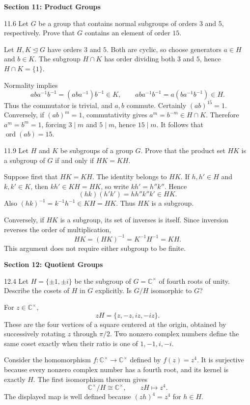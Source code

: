 \documentclass[11pt]{article}
\newcommand{\sectionheading}[1]{%
  \Needspace{8\baselineskip}
  \vspace{0.25em}
  {\color{darkgray}\large\bfseries #1}\par
}
\newcommand{\C}{\mathbb C}
\begin{document}
\sectionheading{Section 11: Product Groups}

\begin{exercise}{11.6}
Let $G$ be a group that contains normal subgroups of orders $3$ and $5$,
respectively. Prove that $G$ contains an element of order $15$.
\end{exercise}

\begin{solution}
Let $H,K\trianglelefteq G$ have orders $3$ and $5$. Both are cyclic, so choose generators $a\in H$ and $b\in K$. The subgroup $H\cap K$ has order dividing both $3$ and $5$, hence $H\cap K=\{1\}$.

Normality implies
\[
 aba^{-1}b^{-1}=(aba^{-1})b^{-1}\in K,
 \qquad
 aba^{-1}b^{-1}=a(ba^{-1}b^{-1})\in H.
\]
Thus the commutator is trivial, and $a,b$ commute. Certainly $(ab)^{15}=1$. Conversely, if $(ab)^m=1$, commutativity gives $a^m=b^{-m}\in H\cap K$. Therefore $a^m=b^m=1$, forcing $3\mid m$ and $5\mid m$, hence $15\mid m$. It follows that $\boxed{\operatorname{ord}(ab)=15}$.
\end{solution}

\begin{exercise}{11.9}
Let $H$ and $K$ be subgroups of a group $G$. Prove that the product set
$HK$ is a subgroup of $G$ if and only if $HK=KH$.
\end{exercise}

\begin{solution}
Suppose first that $HK=KH$. The identity belongs to $HK$. If $h,h'\in H$ and $k,k'\in K$, then $kh'\in KH=HK$, so write $kh'=h''k''$. Hence
\[
 (hk)(h'k')=hh''k''k'\in HK.
\]
Also $(hk)^{-1}=k^{-1}h^{-1}\in KH=HK$. Thus $HK$ is a subgroup.

Conversely, if $HK$ is a subgroup, its set of inverses is itself. Since inversion reverses the order of multiplication,
\[
 HK=(HK)^{-1}=K^{-1}H^{-1}=KH.
\]
This argument does not require either subgroup to be finite.
\end{solution}


\sectionheading{Section 12: Quotient Groups}

\begin{exercise}{12.4}
Let $H=\{\pm1,\pm i\}$ be the subgroup of $G=\mathbb{C}^{\times}$ of
fourth roots of unity. Describe the cosets of $H$ in $G$ explicitly.
Is $G/H$ isomorphic to $G$?
\end{exercise}

\begin{solution}
For $z\in\C^\times$,
\[
 \boxed{zH=\{z,-z,iz,-iz\}.}
\]
These are the four vertices of a square centered at the origin, obtained by successively rotating $z$ through $\pi/2$. Two nonzero complex numbers define the same coset exactly when their ratio is one of $1,-1,i,-i$.

Consider the homomorphism $f:\C^\times\to\C^\times$ defined by $f(z)=z^4$. It is surjective because every nonzero complex number has a fourth root, and its kernel is exactly $H$. The first isomorphism theorem gives
\[
 \boxed{\C^\times/H\cong\C^\times,\qquad zH\longmapsto z^4.}
\]
The displayed map is well defined because $(zh)^4=z^4$ for $h\in H$.
\end{solution}
\end{document}
